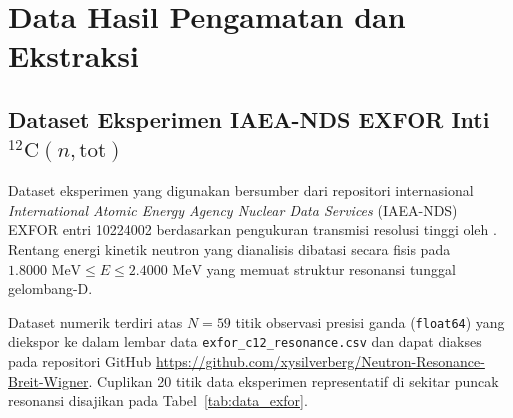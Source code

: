 \section{Data Hasil Pengamatan dan Ekstraksi}

\subsection*{Dataset Eksperimen IAEA-NDS EXFOR Inti \texorpdfstring{$^{12}\text{C}(n,\text{tot})$}{12C(n,tot)}}
Dataset eksperimen yang digunakan bersumber dari repositori internasional \textit{International Atomic Energy Agency Nuclear Data Services} (IAEA-NDS) EXFOR entri 10224002 berdasarkan pengukuran transmisi resolusi tinggi oleh \textcite{cierjacks1968high}. Rentang energi kinetik neutron yang dianalisis dibatasi secara fisis pada $1.8000\text{ MeV} \le E \le 2.4000\text{ MeV}$ yang memuat struktur resonansi tunggal gelombang-D.

Dataset numerik terdiri atas $N = 59$ titik observasi presisi ganda (\texttt{float64}) yang diekspor ke dalam lembar data \texttt{exfor\_c12\_resonance.csv} dan dapat diakses pada repositori GitHub \url{https://github.com/xysilverberg/Neutron-Resonance-Breit-Wigner}. Cuplikan 20 titik data eksperimen representatif di sekitar puncak resonansi disajikan pada Tabel~\ref{tab:data_exfor}.

